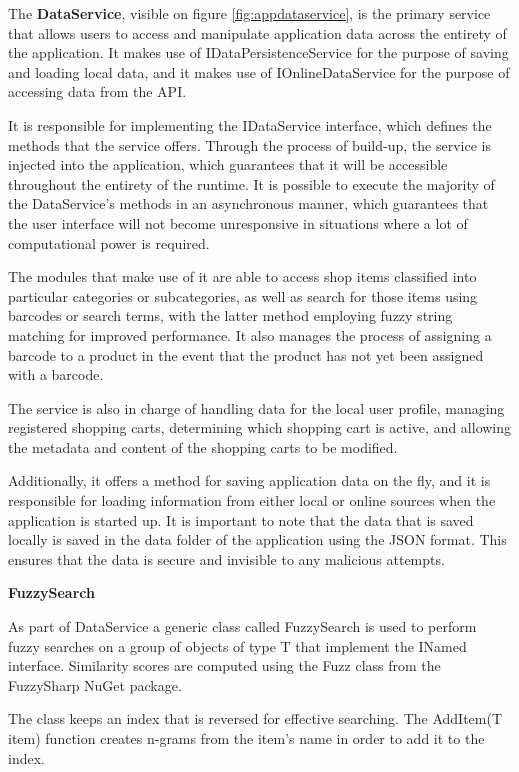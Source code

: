 The \textbf{DataService}, visible on figure \ref{fig:appdataservice}, is the primary service that allows users to access and manipulate application data across the entirety of the application. It makes use of IDataPersistenceService for the purpose of saving and loading local data, and it makes use of IOnlineDataService for the purpose of accessing data from the API. 

It is responsible for implementing the IDataService interface, which defines the methods that the service offers. Through the process of build-up, the service is injected into the application, which guarantees that it will be accessible throughout the entirety of the runtime. It is possible to execute the majority of the DataService's methods in an asynchronous manner, which guarantees that the user interface will not become unresponsive in situations where a lot of computational power is required. 

The modules that make use of it are able to access shop items classified into particular categories or subcategories, as well as search for those items using barcodes or search terms, with the latter method employing fuzzy string matching for improved performance. It also manages the process of assigning a barcode to a product in the event that the product has not yet been assigned with a barcode. 

\pagebreak

The service is also in charge of handling data for the local user profile, managing registered shopping carts, determining which shopping cart is active, and allowing the metadata and content of the shopping carts to be modified.

Additionally, it offers a method for saving application data on the fly, and it is responsible for loading information from either local or online sources when the application is started up. It is important to note that the data that is saved locally is saved in the data folder of the application using the JSON format. This ensures that the data is secure and invisible to any malicious attempts. 

\noindent\textbf{FuzzySearch}

As part of DataService a generic class called FuzzySearch is used to perform fuzzy searches on a group of objects of type T that implement the INamed interface. Similarity scores are computed using the Fuzz class from the FuzzySharp NuGet package.

The class keeps an index that is reversed for effective searching. The AddItem(T item) function creates n-grams from the item's name in order to add it to the index.

